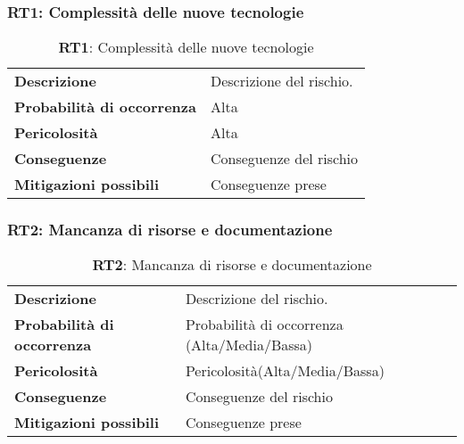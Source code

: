\subsubsection{RT1: Complessità delle nuove tecnologie}
\begin{table}[h!]
    \centering
    \renewcommand{\arraystretch}{1.5} %
    \begin{tabularx}{\textwidth}{|X|X|}\hline
    \rowcolor[HTML]{FFD700} 
    \multicolumn{2}{|c|}{\textbf{Complessità delle nuove tecnologie}} \\ \hline
    \textbf{Descrizione} & Descrizione del rischio. \\ \hline
    \textbf{Probabilità di occorrenza} & Alta \\ \hline
    \textbf{Pericolosità} & Alta \\ \hline
    \textbf{Conseguenze} & Conseguenze del rischio \\ \hline
    \textbf{Mitigazioni possibili} & Conseguenze prese \\ \hline
    \end{tabularx}
    \caption{\textbf{RT1}: Complessità delle nuove tecnologie}
    \end{table}

\subsubsection{RT2: Mancanza di risorse e documentazione}
\begin{table}[h!]
    \centering
    \renewcommand{\arraystretch}{1.5} %
    \begin{tabularx}{\textwidth}{|X|X|}\hline
    \rowcolor[HTML]{FFD700} 
    \multicolumn{2}{|c|}{\textbf{Mancanza di risorse e documentazione}} \\ \hline
    \textbf{Descrizione} & Descrizione del rischio. \\ \hline
    \textbf{Probabilità di occorrenza} & Probabilità di occorrenza (Alta/Media/Bassa) \\ \hline
    \textbf{Pericolosità} & Pericolosità(Alta/Media/Bassa) \\ \hline
    \textbf{Conseguenze} & Conseguenze del rischio \\ \hline
    \textbf{Mitigazioni possibili} & Conseguenze prese \\ \hline
    \end{tabularx}
    \caption{\textbf{RT2}: Mancanza di risorse e documentazione}
    \end{table}


